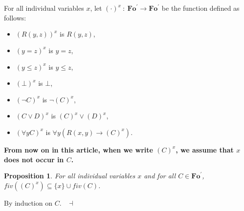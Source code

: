 \documentclass[draft]{article}
\newtheorem{proposition}{Proposition}
\newenvironment{proof}{{\bf Proof:}}{~$\dashv$\\}
\def\Fo{\mathbf{Fo}}
\begin{document}
%
%
\\
\\
%
%
For all individual variables $x$, let $(\cdot)^{x}\ :\ \Fo^{\prime}{\longrightarrow}\Fo^{\prime}$ be the function defined as follows:
%
%
\begin{itemize}
%
%
\item $(R(y,z))^{x}$ is $R(y,z)$,
%
%
\item $(y{=}z)^{x}$ is $y{=}z$,
%
%
\item $(y{\leq}z)^{x}$ is $y{\leq}z$,
%
%
\item $({\bot})^{x}$ is $\bot$,
%
%
\item $({\neg}C)^{x}$ is ${\neg}(C)^{x}$,
%
%
\item $(C{\vee}D)^{x}$ is $(C)^{x}{\vee}(D)^{x}$,
%
%
\item $({\forall y}C)^{x}$ is ${\forall y}(R(x,y){\rightarrow}(C)^{x})$.
%
%
\end{itemize}
%
%
{\bf From now on in this article, when we write $(C)^{x}$, we assume that $x$ does not occur in $C$.}
%
%
\begin{proposition}
%
%
For all individual variables $x$ and for all $C{\in}\Fo^{\prime}$, $fiv((C)^{x}){\subseteq}\{x\}{\cup}
%
%
%
%
%
%
%
$\linebreak$
%
%
%
%
%
%
fiv(C)$.
%
%
\end{proposition}
%
%
\begin{proof}
%
%
By induction on $C$.
%
%
\medskip
%
%
\end{proof}
%
%
%
%
\end{document}
